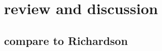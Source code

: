 
\graphicspath{{./sections/appendix/assets}}

\chapter{review and discussion}

\section{compare to Richardson}